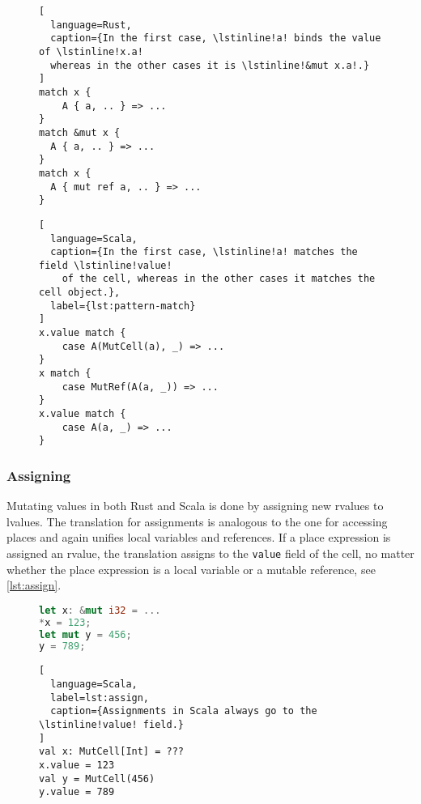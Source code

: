 \begin{figure}
\noindent\begin{minipage}[t]{.48\textwidth}
\begin{lstlisting}[
  language=Rust,
  caption={In the first case, \lstinline!a! binds the value of \lstinline!x.a!
  whereas in the other cases it is \lstinline!&mut x.a!.}
]
match x {
    A { a, .. } => ...
}
match &mut x {
  A { a, .. } => ...
}
match x {
  A { mut ref a, .. } => ...
}
\end{lstlisting}
\end{minipage}\hfill
\begin{minipage}[t]{.48\textwidth}
\begin{lstlisting}[
  language=Scala,
  caption={In the first case, \lstinline!a! matches the field \lstinline!value!
    of the cell, whereas in the other cases it matches the cell object.},
  label={lst:pattern-match}
]
x.value match {
    case A(MutCell(a), _) => ...
}
x match {
    case MutRef(A(a, _)) => ...
}
x.value match {
    case A(a, _) => ...
}
\end{lstlisting}
\end{minipage}
\end{figure}


\subsubsection{Assigning}

Mutating values in both Rust and Scala is done by assigning new rvalues to
lvalues. The translation for assignments is analogous to the one for accessing
places and again unifies local variables and references. If a place expression
is assigned an rvalue, the translation assigns to the
\passthrough{\lstinline!value!} field of the cell, no matter whether the place
expression is a local variable or a mutable reference, see \autoref{lst:assign}.

\begin{figure}
\noindent\begin{minipage}[t]{.45\textwidth}
\begin{lstlisting}[language=Rust, caption={Dereferencing and assigning in Rust.}]
let x: &mut i32 = ...
*x = 123;
let mut y = 456;
y = 789;
\end{lstlisting}
\end{minipage}\hfill
\begin{minipage}[t]{.45\textwidth}
\begin{lstlisting}[
  language=Scala,
  label=lst:assign,
  caption={Assignments in Scala always go to the \lstinline!value! field.}
]
val x: MutCell[Int] = ???
x.value = 123
val y = MutCell(456)
y.value = 789
\end{lstlisting}
\end{minipage}
\end{figure}

